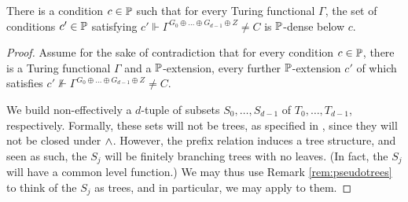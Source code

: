 \begin{lemma}\label{lem:hl-sca-density-below-a-cone}
There is a condition $c \in \mathbb{P}$
such that for every Turing functional $\Gamma$, the set of conditions $c' \in \mathbb{P}$
satisfying $c' \Vdash \Gamma^{G_0 \oplus \dots \oplus G_{d-1} \oplus Z} \neq C$
is $\mathbb{P}$-dense below $c$.
\end{lemma}
\begin{proof}
Assume for the sake of contradiction that for every condition $c \in \mathbb{P}$,
there is a Turing functional $\Gamma$ and a $\mathbb{P}$-extension, every further $\mathbb{P}$-extension $c'$ of which satisfies $c' \not\Vdash \Gamma^{G_0 \oplus \dots \oplus G_{d-1} \oplus Z} \neq C$.

We build non-effectively a $d$-tuple of subsets $S_0, \dots, S_{d-1}$ of $T_0, \dots, T_{d-1}$, respectively. Formally, these sets will not be trees, as specified in , since they will not be closed under $\wedge$. However, the prefix relation induces a tree structure, and seen as such, the $S_j$ will be finitely branching trees with no leaves. (In fact, the $S_j$ will have a common level function.) We may thus use Remark \ref{rem:pseudotrees} to think of the $S_j$ as trees, and in particular, we may apply  to them.


\end{proof}
